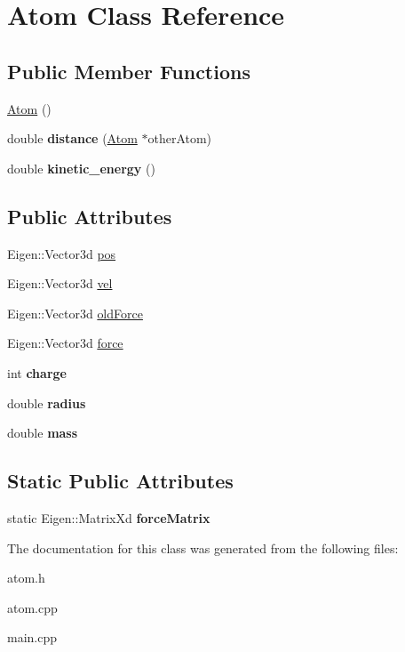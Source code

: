 \hypertarget{class_atom}{}\section{Atom Class Reference}
\label{class_atom}
\subsection*{Public Member Functions}
\begin{DoxyCompactItemize}
\item 
\mbox{\hyperlink{group___atom_gaa0147d7e49ab90f559b66e38d3d12863}{Atom}} ()
\item 
double {\bfseries distance} (\mbox{\hyperlink{class_atom}{Atom}} $\ast$other\+Atom)
\item 
double {\bfseries kinetic\+\_\+energy} ()
\end{DoxyCompactItemize}
\subsection*{Public Attributes}
\begin{DoxyCompactItemize}
\item 
Eigen\+::\+Vector3d \mbox{\hyperlink{group___atom_ga9c44a53717ca3857065c0a36787359e1}{pos}}
\item 
Eigen\+::\+Vector3d \mbox{\hyperlink{group___atom_gaabc1e87e4ed861ae02f781d3f43d8481}{vel}}
\item 
Eigen\+::\+Vector3d \mbox{\hyperlink{group___atom_gaf5b2daf8c6f32465b0ab1aecab57915b}{old\+Force}}
\item 
Eigen\+::\+Vector3d \mbox{\hyperlink{group___atom_ga33b530b8900b57bfa933ae79c7e95d71}{force}}
\item 
int {\bfseries charge}
\item 
double {\bfseries radius}
\item 
double {\bfseries mass}
\end{DoxyCompactItemize}
\subsection*{Static Public Attributes}
\begin{DoxyCompactItemize}
\item 
static Eigen\+::\+Matrix\+Xd {\bfseries force\+Matrix}
\end{DoxyCompactItemize}


The documentation for this class was generated from the following files\+:\begin{DoxyCompactItemize}
\item 
atom.\+h\item 
atom.\+cpp\item 
main.\+cpp\end{DoxyCompactItemize}

